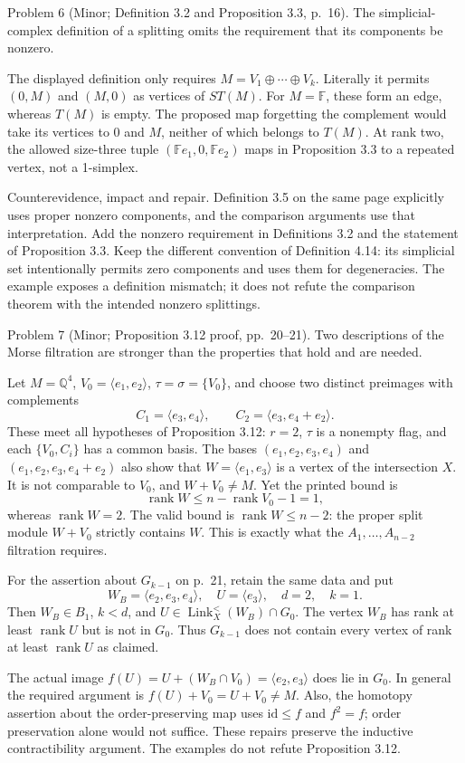 \documentclass[10pt]{article}
\begin{document}
Problem 6 (Minor; Definition 3.2 and Proposition 3.3, p. 16).  The simplicial-complex definition of a splitting omits the requirement that its components be nonzero.\par
The displayed definition only requires \(M=V_1\oplus\cdots\oplus V_k\). Literally it permits \((0,M)\) and \((M,0)\) as vertices of \(ST(M)\). For \(M=\mathbb F\), these form an edge, whereas \(T(M)\) is empty. The proposed map forgetting the complement would take its vertices to \(0\) and \(M\), neither of which belongs to \(T(M)\). At rank two, the allowed size-three tuple \((\mathbb Fe_1,0,\mathbb Fe_2)\) maps in Proposition 3.3 to a repeated vertex, not a 1-simplex.\par
Counterevidence, impact and repair. Definition 3.5 on the same page explicitly uses proper nonzero components, and the comparison arguments use that interpretation. Add the nonzero requirement in Definitions 3.2 and the statement of Proposition 3.3. Keep the different convention of Definition 4.14: its simplicial set intentionally permits zero components and uses them for degeneracies. The example exposes a definition mismatch; it does not refute the comparison theorem with the intended nonzero splittings.\par
Problem 7 (Minor; Proposition 3.12 proof, pp. 20–21).  Two descriptions of the Morse filtration are stronger than the properties that hold and are needed.\par
Let \(M=\mathbb Q^4\), \(V_0=\langle e_1,e_2\rangle\), \(\tau=\sigma=\{V_0\}\), and choose two distinct preimages with complements \[C_1=\langle e_3,e_4\rangle,\qquad
 C_2=\langle e_3,e_4+e_2\rangle.\] These meet all hypotheses of Proposition 3.12: \(r=2\), \(\tau\) is a nonempty flag, and each \(\{V_0,C_i\}\) has a common basis. The bases \((e_1,e_2,e_3,e_4)\) and \((e_1,e_2,e_3,e_4+e_2)\) also show that \(W=\langle e_1,e_3\rangle\) is a vertex of the intersection \(X\). It is not comparable to \(V_0\), and \(W+V_0\ne M\). Yet the printed bound is \[\operatorname{rank}W\le n-\operatorname{rank}V_0-1=1,\] whereas \(\operatorname{rank}W=2\). The valid bound is \(\operatorname{rank}W\le n-2\): the proper split module \(W+V_0\) strictly contains \(W\). This is exactly what the \(A_1,\ldots,A_{n-2}\) filtration requires.\par
For the assertion about \(G_{k-1}\) on p. 21, retain the same data and put \[W_B=\langle e_2,e_3,e_4\rangle,\quad U=\langle e_3\rangle,
 \quad d=2,\quad k=1.\] Then \(W_B\in B_1\), \(k<d\), and \(U\in\operatorname{Link}^{<}_X(W_B)\cap G_0\). The vertex \(W_B\) has rank at least \(\operatorname{rank}U\) but is not in \(G_0\). Thus \(G_{k-1}\) does not contain every vertex of rank at least \(\operatorname{rank}U\) as claimed.\par
The actual image \(f(U)=U+(W_B\cap V_0)=\langle e_2,e_3\rangle\) does lie in \(G_0\). In general the required argument is \(f(U)+V_0=U+V_0\ne M\). Also, the homotopy assertion about the order-preserving map uses \(\mathrm{id}\le f\) and \(f^2=f\); order preservation alone would not suffice. These repairs preserve the inductive contractibility argument. The examples do not refute Proposition 3.12.\par
\end{document}
